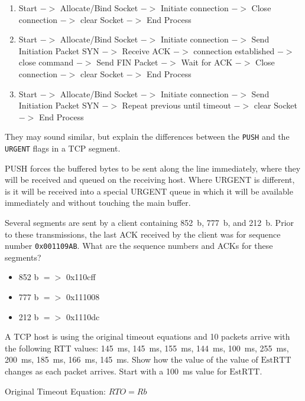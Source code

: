 \documentclass[12pt,addpoints,answers]{exam}
\begin{document}
\begin{questions}
\begin{solution}
	\begin{enumerate}[label=\Alph*]
		\item 
			Start $->$ Allocate/Bind Socket $->$ Initiate connection $->$ Close connection $->$ clear Socket $->$ End Process
		\item 
			Start $->$ Allocate/Bind Socket $->$ Initiate connection $->$ Send Initiation Packet SYN $->$ Receive ACK $->$ connection established $->$ close command $->$ Send FIN Packet $->$ Wait for ACK $->$ Close connection $->$ clear Socket $->$ End Process
		\item 
			Start $->$ Allocate/Bind Socket $->$ Initiate connection $->$ Send Initiation Packet SYN  $->$ Repeat previous until timeout $->$ clear Socket $->$ End Process
	\end{enumerate}
\end{solution}

\question[4] They may sound similar, but explain the differences between the \lstinline{PUSH} and the \lstinline{URGENT} flags in a TCP segment.
\begin{solution}
	PUSH forces the buffered bytes to be sent along the line immediately, where they will be received and queued on the receiving host.  Where URGENT is different, is it will be received into a special URGENT queue in which it will be available immediately and without touching the main buffer.
\end{solution}

\question[6] Several segments are sent by a client containing \SI{852}{b}, \SI{777}{b}, and \SI{212}{b}. Prior to these transmissions, the last ACK received by the client was for sequence number \texttt{0x001109AB}. What are the sequence numbers and ACKs for these segments?
\begin{solution}
	\begin{itemize}
		\item 852 b $=>$ 0x110cff
		\item 777 b $=>$ 0x111008
		\item 212 b $=>$ 0x1110dc
	\end{itemize}
\end{solution}

\question[10] A TCP host is using the original timeout equations and 10 packets arrive with the following RTT values: \SI{145}{\milli\second}, \SI{145}{\milli\second}, \SI{155}{\milli\second}, \SI{144}{\milli\second}, \SI{100}{\milli\second}, \SI{255}{\milli\second}, \SI{200}{\milli\second}, \SI{185}{\milli\second}, \SI{166}{\milli\second}, \SI{145}{\milli\second}. Show how the value of the value of $\mathrm{EstRTT}$ changes as each packet arrives. Start with a \SI{100}{\milli\second} value for $\mathrm{EstRTT}$.
\begin{solution}
	Original Timeout Equation: $RTO = Rb$
	

\end{solution}
\end{questions}
\end{document}
